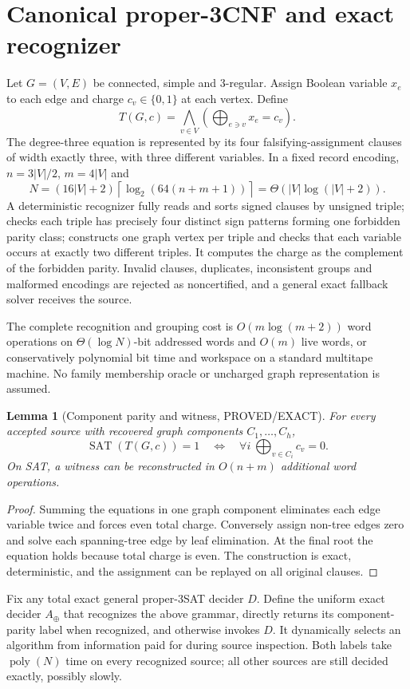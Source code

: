 \documentclass[11pt]{article}
\newtheorem{lemma}{Lemma}
\begin{document}
\section{Canonical proper-3CNF and exact recognizer}
Let $G=(V,E)$ be connected, simple and 3-regular. Assign Boolean variable $x_e$ to each edge and charge $c_v\in\{0,1\}$ at each vertex. Define
\[
T(G,c)=\bigwedge_{v\in V}\left(\bigoplus_{e\ni v}x_e=c_v\right).
\tag{1}
\]
The degree-three equation is represented by its four falsifying-assignment clauses of width exactly three, with three different variables. In a fixed record encoding, $n=3|V|/2$, $m=4|V|$ and
\[
N=(16|V|+2)\left\lceil\log_2(64(n+m+1))\right\rceil
=\Theta(|V|\log(|V|+2)).
\tag{2}
\]
A deterministic recognizer fully reads and sorts signed clauses by unsigned triple; checks each triple has precisely four distinct sign patterns forming one forbidden parity class; constructs one graph vertex per triple and checks that each variable occurs at exactly two different triples. It computes the charge as the complement of the forbidden parity. Invalid clauses, duplicates, inconsistent groups and malformed encodings are rejected as noncertified, and a general exact fallback solver receives the source.

The complete recognition and grouping cost is $O(m\log(m+2))$ word operations on $\Theta(\log N)$-bit addressed words and $O(m)$ live words, or conservatively polynomial bit time and workspace on a standard multitape machine. No family membership oracle or uncharged graph representation is assumed.

\begin{lemma}[Component parity and witness, PROVED/EXACT]
For every accepted source with recovered graph components $C_1,\ldots,C_h$,
\[
\operatorname{SAT}(T(G,c))=1
\quad\Longleftrightarrow\quad
\forall i\ \bigoplus_{v\in C_i}c_v=0.
\tag{3}
\]
On SAT, a witness can be reconstructed in $O(n+m)$ additional word operations.
\end{lemma}
\begin{proof}
Summing the equations in one graph component eliminates each edge variable twice and forces even total charge. Conversely assign non-tree edges zero and solve each spanning-tree edge by leaf elimination. At the final root the equation holds because total charge is even. The construction is exact, deterministic, and the assignment can be replayed on all original clauses.
\end{proof}

Fix any total exact general proper-3SAT decider $D$. Define the uniform exact decider $A_{\oplus}$ that recognizes the above grammar, directly returns its component-parity label when recognized, and otherwise invokes $D$. It dynamically selects an algorithm from information paid for during source inspection. Both labels take $\operatorname{poly}(N)$ time on every recognized source; all other sources are still decided exactly, possibly slowly.
\end{document}
